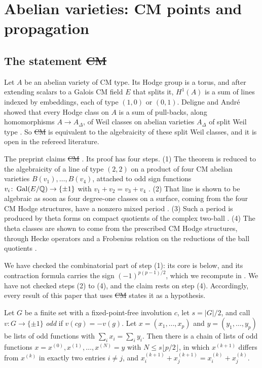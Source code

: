 \section{Abelian varieties: CM points and propagation}\label{sec:abelian}

\subsection{The statement \texorpdfstring{\st{CM}}{(CM)}}\label{ssec:cmclaim}
Let $A$ be an abelian variety of CM type. Its Hodge group is a torus, and
after extending scalars to a Galois CM field $E$ that splits it, $H^{1}(A)$
is a sum of lines indexed by embeddings, each of type $(1,0)$ or $(0,1)$.
Deligne and Andr\'e showed that every Hodge class on $A$ is a sum of
pull-backs, along homomorphisms $A\to A_{\Delta}$, of Weil classes on
abelian varieties $A_{\Delta}$ of split Weil type \cite[Theorem~1]{Mil20}.
So \st{CM} is equivalent to the algebraicity of these split Weil classes, and
it is open in the refereed literature.

The preprint \cite{OAI26} claims \st{CM} \cite[Theorem~1.1]{OAI26}. Its proof
has four steps. (1) The theorem is reduced \cite[Proposition~2.6]{OAI26} to
the algebraicity of a line of type $(2,2)$ on a product of four CM abelian
varieties $B(v_{1}),\dots,B(v_{4})$, attached to odd sign functions
$v_{i}\colon\operatorname{Gal}(E/\mathbb{Q})\to\{\pm1\}$ with $v_{1}+v_{2}=v_{3}+v_{4}$
\cite[Theorem~2.5]{OAI26}. (2) That line is shown to be algebraic as soon as
four degree-one classes on a surface, coming from the four CM Hodge
structures, have a nonzero mixed period \cite[Proposition~3.1]{OAI26}. (3)
Such a period is produced by theta forms on compact quotients of the complex
two-ball \cite[\S4]{OAI26}. (4) The theta classes are shown to come from the
prescribed CM Hodge structures, through Hecke operators and a Frobenius
relation on the reductions of the ball quotients \cite[Theorem~5.1 and
Corollary~6.7]{OAI26}.

We have checked the combinatorial part of step (1): its core is
 below, and its contraction formula
\cite[(2.6)]{OAI26} carries the sign $(-1)^{p(p-1)/2}$, which we recompute in
. We have not checked steps (2) to (4), and the claim rests
on step (4). Accordingly, every result of this paper that uses \st{CM}
states it as a hypothesis.

\begin{lemma}\label{lem:switch}
Let $G$ be a finite set with a fixed-point-free involution $c$, let
$s=|G|/2$, and call $v\colon G\to\{\pm1\}$ \emph{odd} if $v(cg)=-v(g)$. Let
$x=(x_{1},\dots,x_{p})$ and $y=(y_{1},\dots,y_{p})$ be lists of odd functions
with $\sum_{i}x_{i}=\sum_{i}y_{i}$. Then there is a chain of lists of odd
functions $x=x^{(0)},x^{(1)},\dots,x^{(N)}=y$ with $N\le s\lfloor
p/2\rfloor$, in which $x^{(k+1)}$ differs from $x^{(k)}$ in exactly two
entries $i\ne j$, and $x^{(k+1)}_{i}+x^{(k+1)}_{j}=x^{(k)}_{i}+x^{(k)}_{j}$.
\end{lemma}

